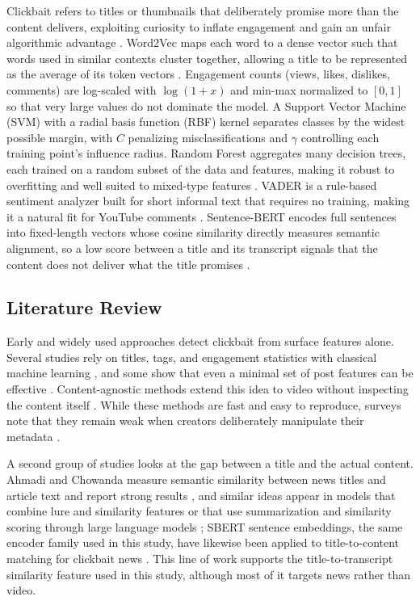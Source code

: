 \documentclass[conference]{IEEEtran}
\begin{document}
Clickbait refers to titles or thumbnails that deliberately promise more than the content delivers, exploiting curiosity to inflate engagement and gain an unfair algorithmic advantage \cite{varshney2021}. Word2Vec maps each word to a dense vector such that words used in similar contexts cluster together, allowing a title to be represented as the average of its token vectors \cite{vierti2019}. Engagement counts (views, likes, dislikes, comments) are log-scaled with $\log(1+x)$ and min-max normalized to $[0,1]$ so that very large values do not dominate the model. A Support Vector Machine (SVM) with a radial basis function (RBF) kernel separates classes by the widest possible margin, with $C$ penalizing misclassifications and $\gamma$ controlling each training point's influence radius. Random Forest aggregates many decision trees, each trained on a random subset of the data and features, making it robust to overfitting and well suited to mixed-type features \cite{gothankar2022}. VADER is a rule-based sentiment analyzer built for short informal text that requires no training, making it a natural fit for YouTube comments \cite{hutto2014}. Sentence-BERT encodes full sentences into fixed-length vectors whose cosine similarity directly measures semantic alignment, so a low score between a title and its transcript signals that the content does not deliver what the title promises \cite{reimers2019}.

\subsection{Literature Review}

Early and widely used approaches detect clickbait from surface features alone. Several studies rely on titles, tags, and engagement statistics with classical machine learning \cite{gothankar2022, vierti2019, coste2021}, and some show that even a minimal set of post features can be effective \cite{stopclickbait2017, clickbaitdetection2018}. Content-agnostic methods extend this idea to video without inspecting the content itself \cite{contentagnostic2019}. While these methods are fast and easy to reproduce, surveys note that they remain weak when creators deliberately manipulate their metadata \cite{bajaj2024, litreview2024}.

A second group of studies looks at the gap between a title and the actual content. Ahmadi and Chowanda measure semantic similarity between news titles and article text and report strong results \cite{ahmadi2023}, and similar ideas appear in models that combine lure and similarity features \cite{lure2021} or that use summarization and similarity scoring through large language models \cite{llmsummary2025}; SBERT sentence embeddings, the same encoder family used in this study, have likewise been applied to title-to-content matching for clickbait news \cite{kumari2023}. This line of work supports the title-to-transcript similarity feature used in this study, although most of it targets news rather than video.
\end{document}

